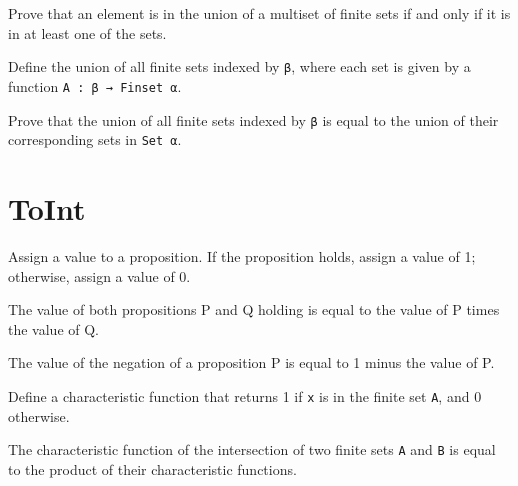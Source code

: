 \begin{lemma}\label{Multiset.eq_FinUnion}
  Prove that an element is in the union of a multiset of finite sets if and only if it is in at least one of the sets.
\end{lemma}

\begin{definition}\label{FinUnion₀}
  Define the union of all finite sets indexed by \verb|β|, where each set is given by a function \verb|A : β → Finset α|.
\end{definition}

\begin{lemma}\label{eq_FinUnion₀}
  Prove that the union of all finite sets indexed by \verb|β| is equal to the union of their corresponding sets in \verb|Set α|.
\end{lemma}

\section{ToInt}

\begin{definition}\label{toInt}
  \leanok
  Assign a value to a proposition. If the proposition holds, assign a value of 1; otherwise, assign a value of 0.
\end{definition}

\begin{lemma}\label{toInt_and}
  \leanok
  The value of both propositions P and Q holding is equal to the value of P times the value of Q.
\end{lemma}

\begin{lemma}\label{toInt_not}
  \leanok
  The value of the negation of a proposition P is equal to 1 minus the value of P.
\end{lemma}

\begin{definition}\label{char_fun}
  \leanok
  Define a characteristic function that returns 1 if \verb|x| is in the finite set \verb|A|, and 0 otherwise.
\end{definition}

\begin{lemma}\label{char_fun_inter}
  The characteristic function of the intersection of two finite sets \verb|A| and \verb|B| is equal to the product of their characteristic functions.
\end{lemma}

